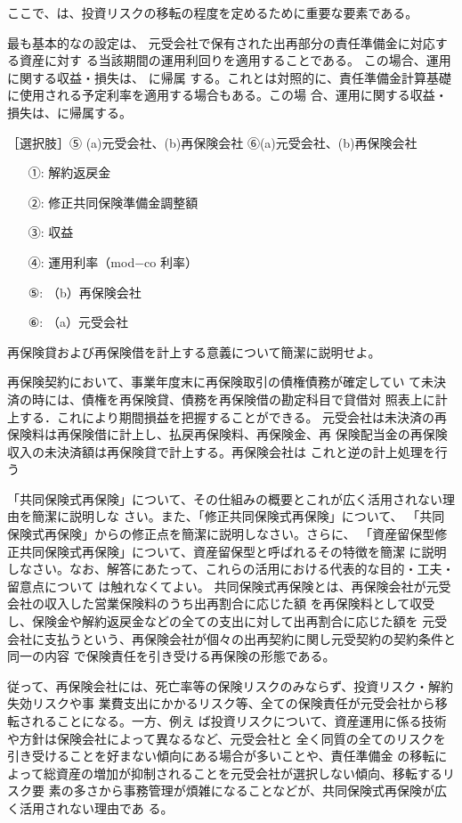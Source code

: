 \documentclass[report,gutter=10mm,fore-edge=10mm,uplatex,dvipdfmx]{jlreq}
\begin{document}
ここで、は、投資リスクの移転の程度を定めるために重要な要素である。

最も基本的なの設定は、
元受会社で保有された出再部分の責任準備金に対応する資産に対す
る当該期間の運用利回りを適用することである。
この場合、運用に関する収益・損失は、 に帰属
する。これとは対照的に、責任準備金計算基礎に使用される予定利率を適用する場合もある。この場
合、運用に関する収益・損失は、に帰属する。

［選択肢］⑤ (a)元受会社、(b)再保険会社    ⑥(a)元受会社、(b)再保険会社

\answer{}

\begin{itemize}
\item[ ①: ] 解約返戻金
\item[ ②: ] 修正共同保険準備金調整額
\item[ ③: ] 収益
\item[ ④: ] 運用利率（mod−co 利率）
\item[ ⑤: ] （b）再保険会社
\item[ ⑥: ] （a）元受会社
\end{itemize}

再保険貸および再保険借を計上する意義について簡潔に説明せよ。

\answer{}
再保険契約において、事業年度末に再保険取引の債権債務が確定してい
て未決済の時には、債権を再保険貸、債務を再保険借の勘定科目で貸借対
照表上に計上する．これにより期間損益を把握することができる。
元受会社は未決済の再保険料は再保険借に計上し、払戻再保険料、再保険金、再
保険配当金の再保険収入の未決済額は再保険貸で計上する。再保険会社は
これと逆の計上処理を行う

「共同保険式再保険」について、その仕組みの概要とこれが広く活用されない理由を簡潔に説明しな
さい。また、「修正共同保険式再保険」について、
「共同保険式再保険」からの修正点を簡潔に説明しなさい。さらに、
「資産留保型修正共同保険式再保険」について、資産留保型と呼ばれるその特徴を簡潔
に説明しなさい。なお、解答にあたって、これらの活用における代表的な目的・工夫・留意点について
は触れなくてよい。
\answer{}
共同保険式再保険とは、再保険会社が元受会社の収入した営業保険料のうち出再割合に応じた額
を再保険料として収受し、保険金や解約返戻金などの全ての支出に対して出再割合に応じた額を
元受会社に支払うという、再保険会社が個々の出再契約に関し元受契約の契約条件と同一の内容
で保険責任を引き受ける再保険の形態である。

従って、再保険会社には、死亡率等の保険リスクのみならず、投資リスク・解約失効リスクや事
業費支出にかかるリスク等、全ての保険責任が元受会社から移転されることになる。一方、例え
ば投資リスクについて、資産運用に係る技術や方針は保険会社によって異なるなど、元受会社と
全く同質の全てのリスクを引き受けることを好まない傾向にある場合が多いことや、責任準備金
の移転によって総資産の増加が抑制されることを元受会社が選択しない傾向、移転するリスク要
素の多さから事務管理が煩雑になることなどが、共同保険式再保険が広く活用されない理由であ
る。
\end{document}
